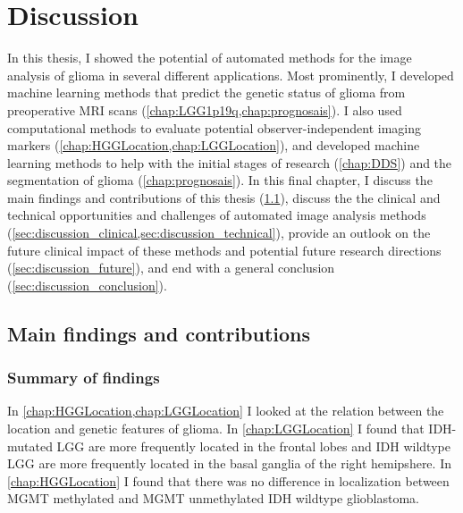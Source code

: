 
\chapter{Discussion}\label{chap:discussion}
\begin{ChapterAbstractNoTitle}
\end{ChapterAbstractNoTitle}
In this thesis, I showed the potential of automated methods for the image analysis of glioma in several different applications.
Most prominently, I developed machine learning methods that predict the genetic status of glioma from preoperative \gls{MRI} scans (\cref{chap:LGG1p19q,chap:prognosais}).
I also used computational methods to evaluate potential observer-independent imaging markers (\cref{chap:HGGLocation,chap:LGGLocation}), and developed machine learning methods to help with the initial stages of research (\cref{chap:DDS}) and the segmentation of glioma (\cref{chap:prognosais}).
In this final chapter, I discuss the main findings and contributions of this thesis (\cref{sec:discussion_main_findings}), discuss the the clinical and technical opportunities and challenges of automated image analysis methods (\cref{sec:discussion_clinical,sec:discussion_technical}), provide an outlook on the future clinical impact of these methods and potential future research directions (\cref{sec:discussion_future}), and end with a general conclusion (\cref{sec:discussion_conclusion}).

\section{Main findings and contributions}\label{sec:discussion_main_findings}

\subsection{Summary of findings}

In \cref{chap:HGGLocation,chap:LGGLocation} I looked at the relation between the location and genetic features of \gls{glioma}.
In \cref{chap:LGGLocation} I found that \gls{IDH}-mutated \gls{LGG} are more frequently located in the frontal lobes and \gls{IDH} wildtype \gls{LGG} are more frequently located in the basal ganglia of the right hemipshere.
In \cref{chap:HGGLocation} I found that there was no difference in localization between \gls{MGMT} methylated and \gls{MGMT} unmethylated \gls{IDH} wildtype glioblastoma.


